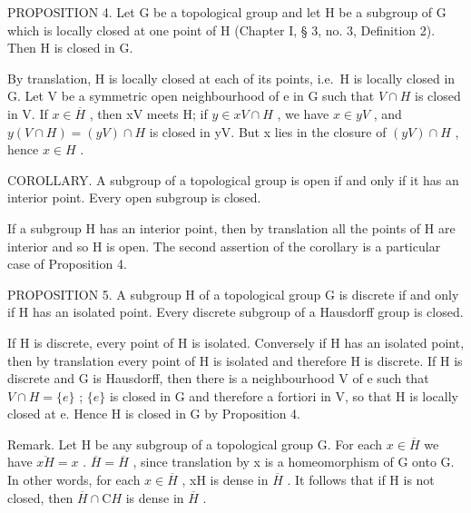 PROPOSITION 4. Let G be a topological group and let H be a subgroup of G which is locally closed at one point of H (Chapter I, § 3, no. 3, Definition 2). Then H is closed in G.

By translation, H is locally closed at each of its points, i.e.~H is locally closed in G. Let V be a symmetric open neighbourhood of e in G such that \(V \cap H\) is closed in V. If \(x \in \overline{H}\) , then xV meets H; if \(y \in xV \cap H\) , we have \(x \in yV\) , and \(y(V \cap H) = (yV) \cap H\) is closed in yV. But x lies in the closure of \((yV) \cap H\) , hence \(x \in H\) .

COROLLARY. A subgroup of a topological group is open if and only if it has an interior point. Every open subgroup is closed.

If a subgroup H has an interior point, then by translation all the points of H are interior and so H is open. The second assertion of the corollary is a particular case of Proposition 4.

PROPOSITION 5. A subgroup H of a topological group G is discrete if and only if H has an isolated point. Every discrete subgroup of a Hausdorff group is closed.

If H is discrete, every point of H is isolated. Conversely if H has an isolated point, then by translation every point of H is isolated and therefore H is discrete. If H is discrete and G is Hausdorff, then there is a neighbourhood V of e such that \(V \cap H = \{e\}\) ; \(\{e\}\) is closed in G and therefore a fortiori in V, so that H is locally closed at e. Hence H is closed in G by Proposition 4.

Remark. Let H be any subgroup of a topological group G. For each \(x \in \overline{H}\) we have \(\overline{xH} = x\) . \(\overline{H} = \overline{H}\) , since translation by x is a homeomorphism of G onto G. In other words, for each \(x \in \overline{H}\) , xH is dense in \(\overline{H}\) . It follows that if H is not closed, then \(\overline{H} \cap \mathrm{C}H\) is dense in \(\overline{H}\) .

